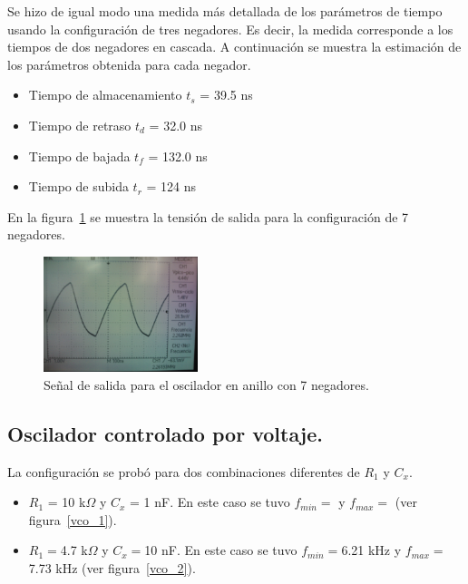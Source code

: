 \documentclass[journal]{IEEEtran}
\begin{document}
Se hizo de igual modo una medida más detallada de los parámetros de tiempo usando la configuración de tres negadores. Es decir, la medida corresponde a los tiempos de dos negadores en cascada. A continuación se muestra la estimación de los parámetros obtenida para cada negador.

\begin{itemize}
	\item Tiempo de almacenamiento $t_s$ = 39.5 ns 
	\item Tiempo de retraso $t_d$ = 32.0 ns
	\item Tiempo de bajada $t_f$ = 132.0 ns
	\item Tiempo de subida $t_r$ = 124 ns	
\end{itemize}

En la figura~\ref{anillo1} se muestra la tensión de salida para la configuración de 7 negadores. 

\begin{figure}[H]%
\centering
	\includegraphics[width=0.40\textwidth]{./pics/WP_000051.jpg}
	\caption{Señal de salida para el oscilador en anillo con 7 negadores.}
	
	\label{anillo1}

\end{figure}

\subsection{Oscilador controlado por voltaje.}
La configuración se probó para dos combinaciones diferentes de $R_1$ y $C_x$. 

\begin{itemize}
	\item $R_1$ = 10 k$\Omega$ y $C_x$ = 1 nF. En este caso se tuvo $f_{min}=$ y $f_{max}=$ (ver figura~\ref{vco_1}).
	\item $R_1=$4.7 k$\Omega$ y $C_x=$10 nF. En este caso se tuvo $f_{min}=$6.21 kHz y $f_{max}=$7.73 kHz (ver figura~\ref{vco_2}).
\end{itemize}
\end{document}
